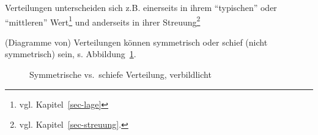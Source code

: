 \documentclass[
  a4paper,
  DIV=11]{scrreprt}
\theoremstyle{definition}
\theoremstyle{definition}
\theoremstyle{definition}
\theoremstyle{remark}
\begin{document}
Verteilungen unterscheiden sich z.B. einerseits in ihrem ``typischen''
oder ``mittleren'' Wert\footnote{vgl. Kapitel~\ref{sec-lage}} und
anderseits in ihrer Streuung\footnote{vgl. Kapitel~\ref{sec-streuung}.}

(Diagramme von) Verteilungen können symmetrisch oder schief (nicht
symmetrisch) sein, s. Abbildung~\ref{fig-symm-schief}.

\begin{figure}

\begin{minipage}{0.50\linewidth}



\end{minipage}%
%
\begin{minipage}{0.50\linewidth}



\end{minipage}%

\caption{\label{fig-symm-schief}Symmetrische vs.~schiefe Verteilung,
verbildlicht}

\end{figure}%
\end{document}
